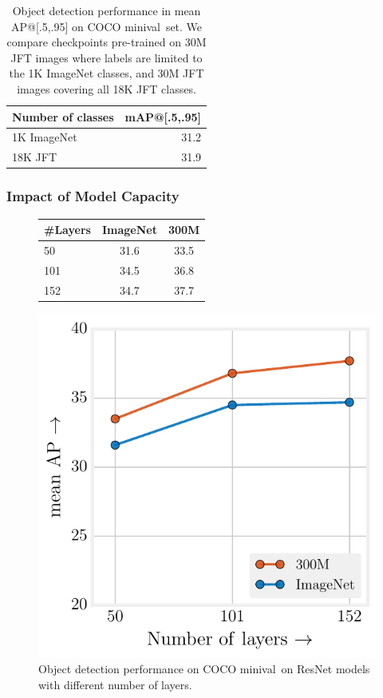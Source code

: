 \documentclass[10pt,twocolumn,letterpaper]{article}
\newcommand{\minival}{minival\raisebox{0.2ex}{$\ast$}}
\begin{document}
\begin{table}
\center
\begin{tabular}{@{}l|r@{}}
Number of classes     &  mAP@[.5,.95] \\
\hline
1K ImageNet & 31.2 \\
18K JFT & 31.9 \\
\end{tabular}
\vspace{0.05in}
\caption{Object detection performance in mean AP@[.5,.95] on COCO \minival\ set. We compare checkpoints pre-trained on 30M JFT images where labels are limited to the 1K ImageNet classes, and 30M JFT images covering all 18K JFT classes.}
\label{tab:coco_num_classes}
\end{table}

\subsubsection*{Impact of Model Capacity}

\begin{figure}
\centering
\begin{minipage}{0.25\textwidth}
   \centering
   \small
   \begin{tabular}{l | c | c}
\#Layers & ImageNet & 300M\\
\hline
50 & 31.6 & 33.5 \\
101 & 34.5 & 36.8 \\
152 & 34.7 & 37.7 \\
\end{tabular}
\end{minipage}%
\begin{minipage}{0.49\columnwidth}
   \centering
  \includegraphics[width=\columnwidth]{coco_resnets_perf_fivethirtyeight}
\end{minipage}%
\vspace{0.01in}
\caption{Object detection performance on COCO \minival\ on ResNet models with different number of layers.}
\label{fig:coco_depth}
\end{figure}
\end{document}
